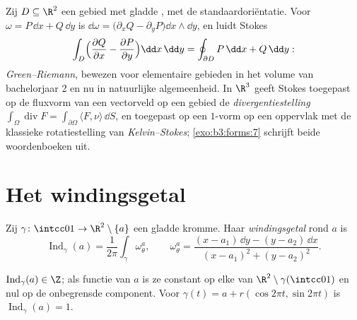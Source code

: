 \begin{example}
\label{ex:b3:forms:classical}
Zij $D \subseteq \R^2$ een  gebied met gladde , met de
standaardoriëntatie. Voor $\omega = P\,\dd x + Q\,\dd y$ is
$\dd\omega = \bigl(\partial_xQ - \partial_yP\bigr)\dd x\wedge\dd
y$, en luidt Stokes
\[
\int_D\Bigl(\frac{\partial Q}{\partial x} -
\frac{\partial P}{\partial y}\Bigr)\dd x\,\dd y
= \oint_{\partial D}P\,\dd x + Q\,\dd y :
\]
\emph{Green--Riemann}, bewezen voor elementaire gebieden in het
volume van bachelorjaar 2 en nu in natuurlijke algemeenheid. In
$\R^3$ geeft Stokes toegepast op de fluxvorm van een vectorveld
op een  gebied de \emph{divergentiestelling}
$\int_\Omega\operatorname{div}F = \int_{\partial\Omega}\langle F,
\nu\rangle\,\dd S$, en toegepast op een $1$-vorm op een oppervlak
met  de klassieke rotatiestelling van
\emph{Kelvin--Stokes}; \cref{exo:b3:forms:7} schrijft beide
woordenboeken uit.
\end{example}

\section{Het windingsgetal}\label{sec:b3:forms:winding}

\begin{definition}\label{def:b3:forms:winding}
Zij $\gamma\colon\intcc01\to\R^2\setminus\{a\}$ een gladde
 kromme. Haar \emph{windingsgetal}
rond $a$ is
\[
\operatorname{Ind}_\gamma(a) =
\frac1{2\pi}\int_\gamma\omega_\theta^a,
\qquad
\omega_\theta^a = \frac{(x - a_1)\,\dd y - (y - a_2)\,\dd
x}{(x - a_1)^2 + (y - a_2)^2} .
\]
\end{definition}

\begin{proposition}\label{prop:b3:forms:windinginteger}
$\operatorname{Ind}_\gamma(a) \in \Z$; als functie van $a$ is ze
constant op elke  van
$\R^2\setminus\gamma(\intcc01)$ en nul op de onbegrensde
component. Voor $\gamma(t) = a + r(\cos2\pi t, \sin2\pi t)$ is
$\operatorname{Ind}_\gamma(a) = 1$.
\end{proposition}

